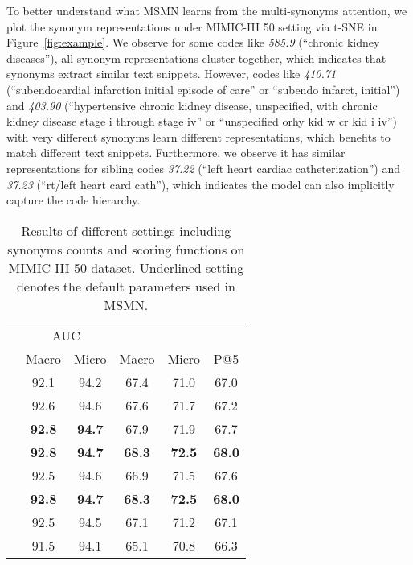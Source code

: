 \documentclass[11pt]{article}
\begin{document}
To better understand what MSMN learns from the multi-synonyms attention, we plot the synonym representations  under MIMIC-III 50 setting via t-SNE \cite{JMLR:v9:vandermaaten08a} in Figure~\ref{fig:example}.
We observe for some codes like \textit{585.9} (``chronic kidney diseases''), all synonym representations cluster together, which indicates that synonyms extract similar text snippets.
However, codes like \textit{410.71} (``subendocardial infarction initial episode of care'' or ``subendo infarct, initial'') and \textit{403.90} (``hypertensive chronic kidney disease, unspecified, with chronic kidney disease stage i through stage iv'' or ``unspecified orhy kid w cr kid i iv'') with very different synonyms learn different representations, which benefits to match different text snippets.
Furthermore, we observe it has similar representations for sibling codes \textit{37.22} (``left heart cardiac catheterization'') and \textit{37.23} (``rt/left heart card cath''), which indicates the model can also implicitly capture the code hierarchy.



\begin{table}
    \small 
    \centering
    \begin{tabular}{lccccc}
    \toprule
    & \multicolumn{2}{c}{AUC}  & \multicolumn{2}{c}{} & \\
    & Macro & Micro & Macro & Micro & P@5 \\
    \midrule
 & 92.1 & 94.2 & 67.4 & 71.0 & 67.0 \\
 & 92.6 & 94.6 & 67.6 & 71.7 & 67.2 \\
 & \textbf{92.8} & \textbf{94.7} & 67.9 & 71.9 & 67.7 \\
     & \textbf{92.8} & \textbf{94.7} & \textbf{68.3} & \textbf{72.5} & \textbf{68.0} \\
 & 92.5 & 94.6 & 66.9 & 71.5 & 67.6 \\
\midrule
     & \textbf{92.8} & \textbf{94.7} & \textbf{68.3} & \textbf{72.5} & \textbf{68.0} \\
 & 92.5& 94.5& 67.1& 71.2& 67.1 \\
     & 91.5& 94.1& 65.1& 70.8& 66.3 \\
    \bottomrule
    \end{tabular}
    \caption{Results of different settings including synonyms counts and scoring functions on MIMIC-III 50 dataset.
    Underlined setting denotes the default parameters used in MSMN.}
    \label{tab:ab}
\end{table}
\end{document}
